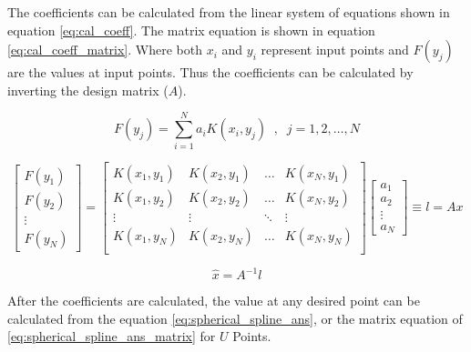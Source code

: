 \documentclass[12pt]{article}
\begin{document}
	The coefficients can be calculated from the linear system of equations shown in equation \ref{eq:cal_coeff}. The matrix equation is shown in equation \ref{eq:cal_coeff_matrix}. Where both $x_i$ and $y_i$ represent input points and $F(y_j)$ are the values at input points. Thus the coefficients can be calculated by inverting the design matrix ($A$).
	
	\begin{equation}
		F(y_j) = \sum_{i=1}^{N}a_iK(x_i,y_j) \;\;,\;\; j=1,2,\dots,N
		\label{eq:cal_coeff}
	\end{equation}
	
	\begin{equation}
		\begin{bmatrix}
			F(y_1) \\ F(y_2) \\ \vdots \\ F(y_N) 
		\end{bmatrix}
		= 
		\begin{bmatrix}
			K(x_1,y_1) & K(x_2,y_1) & \dots & K(x_N,y_1) \\
			K(x_1,y_2) & K(x_2,y_2) & \dots & K(x_N,y_2) \\
			\vdots & \vdots & \ddots & \vdots \\
			K(x_1,y_N) & K(x_2,y_N) & \dots & K(x_N,y_N) \\
		\end{bmatrix}
		\begin{bmatrix}
			a_1 \\ a_2 \\ \vdots \\ a_N
		\end{bmatrix}
		\equiv l = Ax
		\label{eq:cal_coeff_matrix}
	\end{equation}
	
	\begin{equation}
		\hat{x}=A^{-1}l
	\end{equation}
	
	After the coefficients are calculated, the value at any desired point can be calculated from the equation \ref{eq:spherical_spline_ans}, or the matrix equation of \ref{eq:spherical_spline_ans_matrix} for $U$ Points.
	
\end{document}
